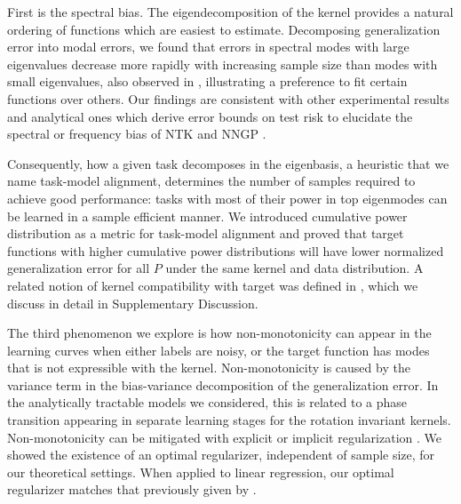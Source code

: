 \documentclass[11pt]{article}
\begin{document}
First is the spectral bias. The eigendecomposition of the kernel provides a natural ordering of functions which are easiest to estimate. Decomposing generalization error into modal errors, we found that errors in spectral modes with large eigenvalues decrease more rapidly with increasing sample size than modes with small eigenvalues, also observed in \cite{bordelon2020spectrum}, illustrating a preference to fit certain functions over others.
Our findings are consistent with other experimental results and analytical ones which derive error bounds on test risk to elucidate the spectral or frequency bias of NTK and NNGP \cite{cao2019understanding,rahaman2018spectral,luo2019frequencybias,valleprez2020generalization}.


Consequently, how a given task decomposes in the eigenbasis, a heuristic that we name task-model alignment, determines the number of samples required to achieve good performance: tasks with most of their power in top eigenmodes can be learned in a sample efficient manner. We introduced cumulative power distribution as a metric for task-model alignment and proved that target functions with higher cumulative power distributions will have lower normalized generalization error for all $P$ under the same kernel and data distribution. A related notion of kernel compatibility with target was defined in \cite{cristianini2002kerneltarget,cortes2012algorithms}, which we discuss in detail in Supplementary Discussion.

The third phenomenon we explore is how non-monotonicity can appear in the learning curves when either labels are noisy, or the target function has modes that is not expressible with the kernel. Non-monotonicity is caused by the variance term in the bias-variance decomposition of the generalization error. In the analytically tractable models we considered, this is related to a phase transition appearing in separate learning stages for the rotation invariant kernels. Non-monotonicity can be mitigated with explicit or implicit regularization \cite{montanari2019generalization,dascoli2020double,nakkiran2019moredata}. We showed the existence of an optimal regularizer, independent of sample size, for our theoretical settings. When applied to linear regression, our optimal regularizer matches that previously given by \cite{nakkiran2020optimal}.
\end{document}
